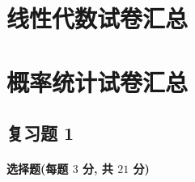 \documentclass[cn,11pt,fancy,hide]{elegantbook}
\begin{document}
\chapter{线性代数试卷汇总}








\chapter{概率统计试卷汇总}

\section{复习题 1}
\subsubsection{选择题(每题 $3$ 分, 共 $21$ 分)}
\end{document}
